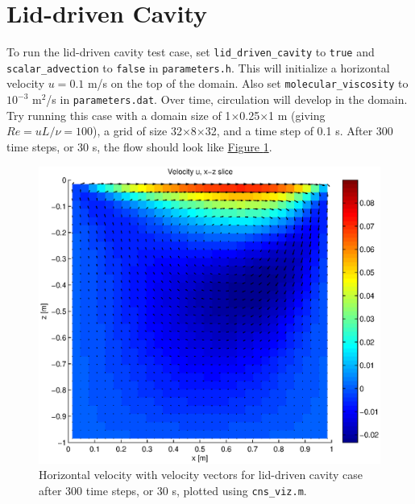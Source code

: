 \documentclass[12pt]{report}
\begin{document}
\section{Lid-driven Cavity}
To run the lid-driven cavity test case, set \texttt{lid\_driven\_cavity} to \texttt{true}  
and \texttt{scalar\_advection} to \texttt{false} in \texttt{parameters.h}. This will initialize a horizontal velocity $u=0.1$ m/s on the top of the domain. Also set
\texttt{molecular\_viscosity} to $10^{-3}$ m$^2$/s in \texttt{parameters.dat}. Over time, circulation will develop in the domain. Try running this case with a domain size of 1$\times$0.25$\times$1 m (giving $Re=uL/\nu=100$), a grid of size 32$\times$8$\times$32, and a time step of 0.1 s. After 300 time steps, or 30 s, the flow should look like \hyperref[fig:lid]{Figure \ref*{fig:lid}}. 
\begin{figure}
\centering
\includegraphics[scale=0.6]{lid}
\caption{Horizontal velocity with velocity vectors for lid-driven cavity case after 300 time steps, or 30 s, plotted using \texttt{cns\_viz.m}.}
\label{fig:lid}
\end{figure}
\end{document}
